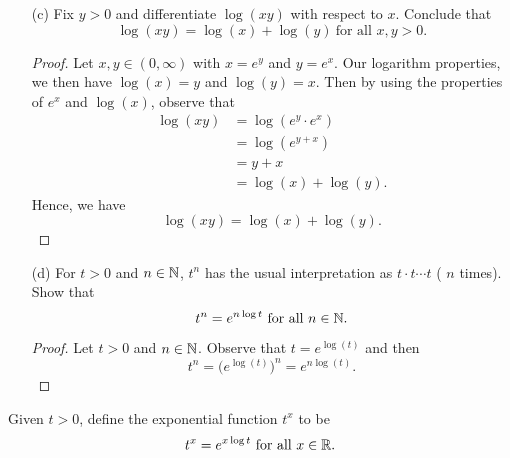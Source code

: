 \begin{enumerate}
\begin{proof}
        \end{proof}
    \item[(c)] Fix \( y > 0  \) and differentiate \( \log(xy)  \) with respect to \( x  \). Conclude that 
        \[  \log(xy) = \log(x) + \log(y) \ \text{for all } x,y > 0. \]
        \begin{proof}
        Let \( x, y \in (0,\infty )  \) with \( x = e^{y}   \) and \( y = e^{x} \). Our logarithm properties, we then have \( \log(x) = y  \) and \( \log(y) = x  \). Then by using the properties of \( e^{x}  \) and \( \log(x)   \), observe that  
        \begin{align*}
            \log(xy) &= \log(e^{y} \cdot e^{x} ) \\
                     &= \log(e^{y+x}) \\
                     &= y + x \\
                     &= \log(x) + \log(y).
        \end{align*} 
        Hence, we have 
        \[  \log(xy) = \log(x) + \log(y). \]

        \end{proof}
    \item[(d)] For \( t > 0  \) and \( n \in \mathbb{N}  \), \( t^{n} \) has the usual interpretation as \( t \cdot t \dotsb t  \) ( \( n \) times).
        Show that 
        \[  t^{n} = e^{n \log t } \ \text{for all } n \in \N.   \]
        \begin{proof}
            Let \( t>0  \) and \( n \in \mathbb{N}  \). Observe that \( t = e^{\log(t)} \) and then 
            \[  t^{n} = \Big( e^{\log(t)}  \Big)^{n} = e^{n \log (t)}. \]
        \end{proof}
\end{enumerate}

\begin{definition}
   Given \( t > 0  \), define the exponential function \( t^{x} \) to be 
   \[  t^{x} = e^{x \log t } \ \text{for all } x \in \mathbb{R}. \]
\end{definition}

